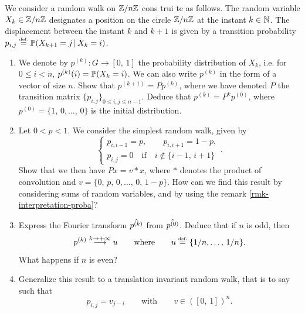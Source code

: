 \begin{exo}
\label{exo-marche-aleatoire}

    We consider a random walk on $\mathbb{Z}/n\mathbb{Z}$ cons \-trui \-te as follows. The random variable $ X_k \in\mathbb{Z}/n\mathbb{Z}$ designates a position on the circle $\mathbb{Z}/n\mathbb{Z}$ at the instant $ k \in \mathbb{N} $. The displacement between the instant $ k $ and $ k + 1$ is given by a transition probability $ p_{i, j} \stackrel{\mbox{\upshape\tiny def.}}{=} \mathbb{P} (X_{k + 1} = j \, |\, X_k = i )$. \begin{enumerate}
\item We denote by $ p^{(k)}: G \rightarrow [0, \, 1]$ the probability distribution of $ X_k $, i.e. for $0 \leq i <n $, $ p^{(k)} (i) = \mathbb{P} (X_k = i)$. We can also write $ p^{(k)}$ in the form of a vector of size $n$. Show that $ p^{(k + 1)} = P p^{(k)}$, where we have denoted $ P $ the transition matrix $\{p_{i, j}\}_{0 \leq i, j \leq n-1}$. Deduce that $ p^{(k)} = P^kp^{(0)}$, where $ p^{(0)} = \{1, \, 0, \ldots, \, 0\}$ is the initial distribution.
\item Let $0 <p <1$. We consider the simplest random walk, given by
\begin{equation*}
\left\{\begin{array}{l} p_{i, i-1} = p, \quad \quad p_{i, i + 1} = 1-p, \\p_{i, j} = 0 \quad \text{if} \quad i \notin \{i-1, \, i + 1\} \end{array} \right. .
\end{equation*}
Show that we then have $ P x = v * x $, where $ *$ denotes the product of convolution and $ v = \{0, \, p, \, 0, \ldots, \, 0, \, 1-p\}$. How can we find this result by considering sums of random variables, and by using the remark \ref{rmk-interpretation-proba}?
\item Express the Fourier transform $\hat{p^{(k)}}$ from $\hat{p^{(0)}}$. Deduce that if $n$ is odd, then
\begin{equation*}
p^{(k)} \overset{k \to +\infty}{\longrightarrow} u \quad \quad \text{where} \quad \quad u \stackrel{\mbox{\upshape\tiny def.}}{=} \{1/n, \ldots, \, 1/n\}.
\end{equation*}
What happens if $n$ is even?
\item {} Generalize this result to a translation invariant random walk, that is to say such that
\begin{equation*}
p_{i, j} = v_{j-i} \quad \quad \text{with} \quad \quad v \in ([0, \, 1])^n.
\end{equation*}


\end{enumerate}
\end{exo}
